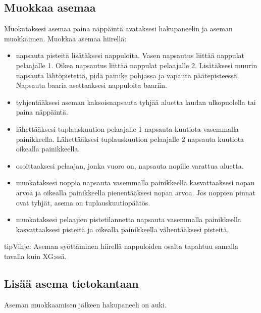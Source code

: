 \documentclass[letterpaper,10pt,finnish]{sphinxmanual}
\begin{document}
\subsection{Muokkaa asemaa}
\label{\detokenize{guide_utilisateur:editer-une-position}}\label{\detokenize{guide_utilisateur:guide-edit-position}}
\sphinxAtStartPar
Muokataksesi asemaa paina \sphinxhyphen{}näppäintä avataksesi hakupaneelin ja aseman muokkaimen. Muokkaa asemaa hiirellä:
\begin{itemize}
\item {} 
\sphinxAtStartPar
napsauta pisteitä lisätäksesi nappuloita. Vasen napsautus liittää nappulat pelaajalle 1. Oikea napsautus liittää nappulat pelaajalle 2. Lisätäksesi muurin napsauta lähtöpistettä, pidä painike pohjassa ja vapauta päätepisteessä. Napsauta baaria asettaaksesi nappuloita baariin.

\item {} 
\sphinxAtStartPar
tyhjentääksesi aseman kaksoisnapsauta tyhjää aluetta laudan ulkopuolella tai paina \sphinxhyphen{}näppäintä.

\item {} 
\sphinxAtStartPar
lähettääksesi tuplauskuution pelaajalle 1 napsauta kuutiota vasemmalla painikkeella. Lähettääksesi tuplauskuution pelaajalle 2 napsauta kuutiota oikealla painikkeella.

\item {} 
\sphinxAtStartPar
osoittaaksesi pelaajan, jonka vuoro on, napsauta nopille varattua aluetta.

\item {} 
\sphinxAtStartPar
muokataksesi noppia napsauta vasemmalla painikkeella kasvattaaksesi nopan arvoa ja oikealla painikkeella pienentääksesi nopan arvoa. Jos noppien pinnat ovat tyhjät, asema on tuplauskuutiopäätös.

\item {} 
\sphinxAtStartPar
muokataksesi pelaajien pistetilannetta napsauta vasemmalla painikkeella kasvattaaksesi pisteitä ja oikealla painikkeella vähentääksesi pisteitä.

\end{itemize}

\begin{sphinxadmonition}{tip}{Vihje:}
\sphinxAtStartPar
Aseman syöttäminen hiirellä nappuloiden osalta tapahtuu samalla tavalla kuin XG:ssä.
\end{sphinxadmonition}


\subsection{Lisää asema tietokantaan}
\label{\detokenize{guide_utilisateur:ajouter-une-position-a-la-base-de-donnees}}
\sphinxAtStartPar
Aseman muokkaamisen jälkeen hakupaneeli on auki.
\end{document}
